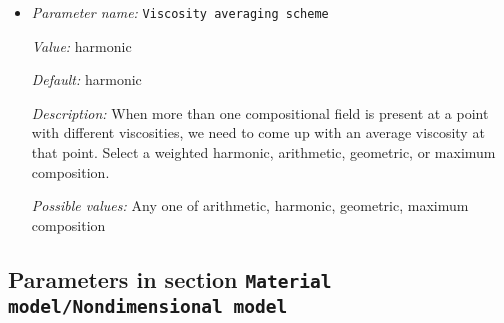 \begin{itemize}
{\it Possible values:} A list of 0 to 4294967295 elements where each element is [A floating point number $v$ such that $0 \leq v \leq \text{MAX\_DOUBLE}$]
\item {\it Parameter name:} {\tt Viscosity averaging scheme}
\label{parameters:Material model/Multicomponent/Viscosity averaging scheme}


{\it Value:} harmonic


{\it Default:} harmonic


{\it Description:} When more than one compositional field is present at a point with different viscosities, we need to come up with an average viscosity at that point.  Select a weighted harmonic, arithmetic, geometric, or maximum composition.


{\it Possible values:} Any one of arithmetic, harmonic, geometric, maximum composition
\end{itemize}

\subsection{Parameters in section \tt Material model/Nondimensional model}
\label{parameters:Material_20model/Nondimensional_20model}

